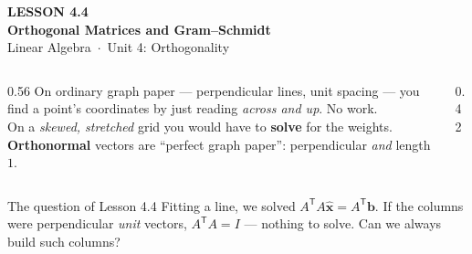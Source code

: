 \documentclass[aspectratio=169, 11pt]{beamer}
\newcommand{\xx}{\mathbf{x}}
\newcommand{\bb}{\mathbf{b}}
\newcommand{\T}{\mathsf{T}}
\begin{document}
{
\begin{frame}[plain]
  \vspace{2.8cm}\hspace{0.55cm}%
  \begin{minipage}{0.9\textwidth}
    {\color{goldacc}\bfseries\small LESSON 4.4}\\[0.5cm]
    {\color{white}\bfseries\LARGE Orthogonal Matrices and Gram--Schmidt}\\[1.0cm]
    {\color{blushmid}\small Linear Algebra~$\cdot$~Unit 4: Orthogonality}
  \end{minipage}
\end{frame}
}

\begin{frame}[t, plain]
  \begin{columns}[T]
    \begin{column}{0.56\textwidth}
      On ordinary graph paper --- perpendicular lines, unit spacing --- you find a point's coordinates by
      just reading \emph{across and up}. No work.\\[6pt]
      On a \emph{skewed, stretched} grid you would have to \textbf{solve} for the weights.\\[8pt]
      \textbf{Orthonormal} vectors are ``perfect graph paper'': perpendicular \emph{and} length $1$.
    \end{column}
    \begin{column}{0.42\textwidth}
      \centering
    \end{column}
  \end{columns}
  \vspace{4pt}
  \begin{block}{The question of Lesson 4.4}
    Fitting a line, we solved $A^{\T}A\hat{\xx}=A^{\T}\bb$. If the columns were perpendicular \emph{unit}
    vectors, $A^{\T}A=I$ --- nothing to solve. Can we always build such columns?
  \end{block}
\end{frame}
\end{document}
